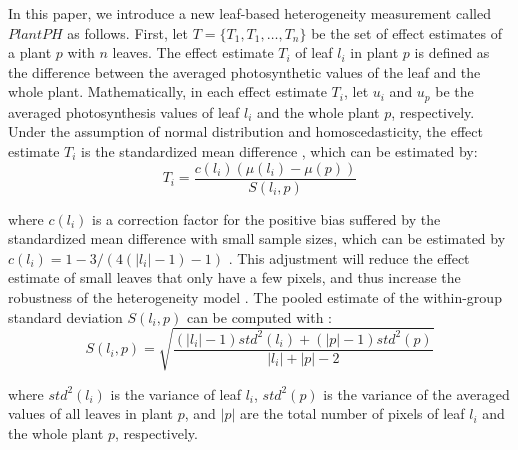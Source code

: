 {%

In this paper, we introduce a new leaf-based heterogeneity measurement called $PlantPH$ as follows.
%
First, let $T = \{T_{1}, T_{1}, \ldots, T_{n}\}$ be the set of effect estimates of a plant $p$ with $n$ leaves. 
The effect estimate $T_{i}$ of leaf $l_i$ in plant $p$ is defined as the difference between the averaged photosynthetic values of the leaf and  the whole plant.
%
Mathematically, in each effect estimate $T_i$, let $u_i$ and $u_p$ be the averaged photosynthesis values of leaf $l_i$ and the whole plant $p$, respectively. Under the assumption of normal distribution and homoscedasticity, the effect estimate $T_i$ is the standardized mean difference \cite{hedges1998fixed}, which can be estimated by: %
%
\begin{equation}\label{eq:effectestimate}
T_{i} =  \frac{c(l_i)\left(\mu(l_i)-\mu(p)\right)}{S(l_i,p)}
\end{equation}

\noindent where $c(l_i)$ is a correction factor for the positive bias suffered by the standardized mean difference with small sample sizes, which can be estimated by $c(l_i) = 1-3/(4(|l_i|-1)-1)$ \cite{hedge1985statistical}. This adjustment will reduce the effect estimate of small leaves that only have a few pixels, and thus increase the robustness of the heterogeneity model \cite{huedo2006assessing}.
%
%
The pooled estimate of the within-group standard deviation $S(l_i, p)$ can be computed with \cite{hedges1998fixed}:
%
\begin{equation}\label{eq:S}
S(l_i, p) = \sqrt{\frac{(|l_i|-1)std^2(l_i)+(|p|-1)std^2(p)}{|l_i|+|p|-2}}
\end{equation}

\noindent where $std^2(l_i)$ is the variance of leaf $l_i$, $std^2(p)$ is  the variance of the averaged values of all leaves in plant $p$, and $|p|$ are the total number of pixels of leaf $l_i$ and the whole plant $p$, respectively.

%

}
